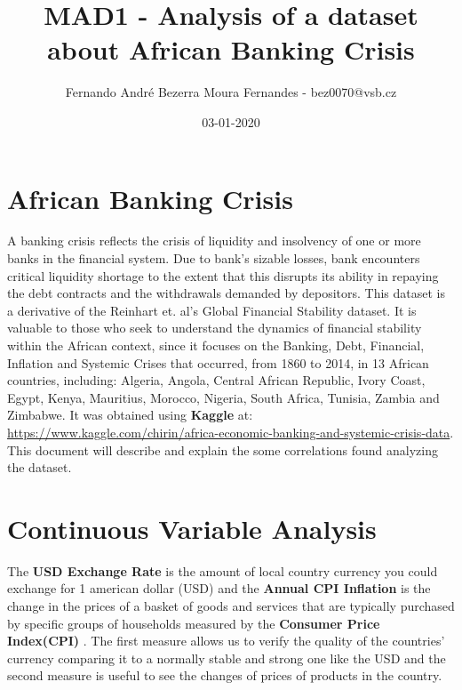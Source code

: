\documentclass{article}
\title{ MAD1 - Analysis of a dataset about African Banking Crisis }
\date{ 03-01-2020 }
\author{ Fernando André Bezerra Moura Fernandes - bez0070@vsb.cz}
\begin{document}
    \maketitle
    \newpage
    \tableofcontents
    \newpage
    \section{ African Banking Crisis }
    
    A banking crisis reflects the crisis of liquidity and insolvency of one or more banks in 
    the financial system. Due to bank's sizable losses, bank encounters critical liquidity 
    shortage to the extent that this disrupts its ability in repaying the debt contracts and 
    the withdrawals demanded by depositors. 
    This dataset is a derivative of the Reinhart et. al's Global Financial Stability dataset.
    It is valuable to those who seek to understand the dynamics of financial stability within 
    the African context, since it focuses on the Banking, Debt, Financial, Inflation and Systemic
    Crises that occurred, from 1860 to 2014, in 13 African countries, including: Algeria, 
    Angola, Central African Republic, Ivory Coast, Egypt, Kenya, Mauritius, Morocco, Nigeria, 
    South Africa, Tunisia, Zambia and Zimbabwe.
    It was obtained using \textbf{Kaggle} at: \url{https://www.kaggle.com/chirin/africa-economic-banking-and-systemic-crisis-data}.
    This document will describe and explain the some correlations found analyzing the dataset. 
    \newpage
    \section{ Continuous Variable Analysis}
    The \textbf{USD Exchange Rate} is the amount of local country currency you could exchange for 1 
    american dollar (USD) and the \textbf{Annual CPI Inflation} is the change in the prices 
    of a basket of goods and services that are typically purchased by specific groups of 
    households measured by the \textbf{ Consumer Price Index(CPI) }. 
    The first measure allows us to verify the quality of the countries' currency 
    comparing it to a normally stable and strong one like the USD and the second
    measure is useful to see the changes of prices of products in the country. 
    
\end{document}

